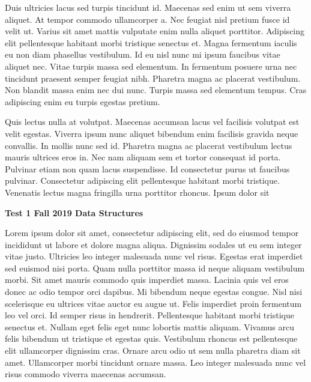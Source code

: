 \documentclass[12pt]{article}
\begin{document}
Duis ultricies lacus sed turpis tincidunt id. Maecenas sed enim ut sem viverra aliquet. At tempor commodo ullamcorper a. Nec feugiat nisl pretium fusce id velit ut. Varius sit amet mattis vulputate enim nulla aliquet porttitor. Adipiscing elit pellentesque habitant morbi tristique senectus et. Magna fermentum iaculis eu non diam phasellus vestibulum. Id eu nisl nunc mi ipsum faucibus vitae aliquet nec. Vitae turpis massa sed elementum. In fermentum posuere urna nec tincidunt praesent semper feugiat nibh. Pharetra magna ac placerat vestibulum. Non blandit massa enim nec dui nunc. Turpis massa sed elementum tempus. Cras adipiscing enim eu turpis egestas pretium.

Quis lectus nulla at volutpat. Maecenas accumsan lacus vel facilisis volutpat est velit egestas. Viverra ipsum nunc aliquet bibendum enim facilisis gravida neque convallis. In mollis nunc sed id. Pharetra magna ac placerat vestibulum lectus mauris ultrices eros in. Nec nam aliquam sem et tortor consequat id porta. Pulvinar etiam non quam lacus suspendisse. Id consectetur purus ut faucibus pulvinar. Consectetur adipiscing elit pellentesque habitant morbi tristique. Venenatis lectus magna fringilla urna porttitor rhoncus. Ipsum dolor sit

\newpage

\noindent
{\Large \bf Test 1 \hfill Fall 2019 Data Structures}

\vspace{0.1in}

Lorem ipsum dolor sit amet, consectetur adipiscing elit, sed do eiusmod tempor incididunt ut labore et dolore magna aliqua. Dignissim sodales ut eu sem integer vitae justo. Ultricies leo integer malesuada nunc vel risus. Egestas erat imperdiet sed euismod nisi porta. Quam nulla porttitor massa id neque aliquam vestibulum morbi. Sit amet mauris commodo quis imperdiet massa. Lacinia quis vel eros donec ac odio tempor orci dapibus. Mi bibendum neque egestas congue. Nisl nisi scelerisque eu ultrices vitae auctor eu augue ut. Felis imperdiet proin fermentum leo vel orci. Id semper risus in hendrerit. Pellentesque habitant morbi tristique senectus et. Nullam eget felis eget nunc lobortis mattis aliquam. Vivamus arcu felis bibendum ut tristique et egestas quis. Vestibulum rhoncus est pellentesque elit ullamcorper dignissim cras. Ornare arcu odio ut sem nulla pharetra diam sit amet. Ullamcorper morbi tincidunt ornare massa. Leo integer malesuada nunc vel risus commodo viverra maecenas accumsan.
\end{document}
